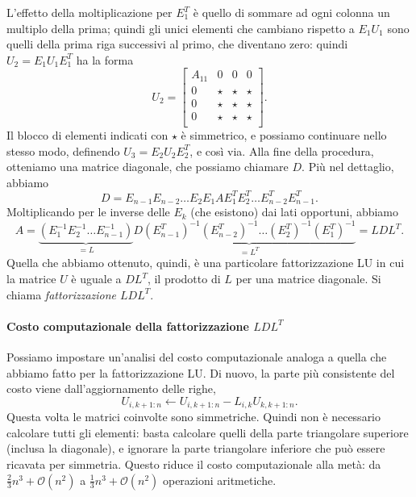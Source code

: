 \documentclass[a4paper]{report}
\theoremstyle{definiton}
\theoremstyle{remark}
\begin{document}
L'effetto della moltiplicazione per $E_1^T$ è quello di sommare ad ogni colonna un multiplo della prima; quindi gli unici elementi che cambiano rispetto a $E_1 U_1$ sono quelli della prima riga successivi al primo, che diventano zero: quindi $U_2 = E_1 U_1 E_1^T$ ha la forma
\[
U_2 = \begin{bmatrix}
    A_{11} & 0 & 0 & 0\\
    0 & \star & \star & \star\\
    0 & \star & \star & \star\\
    0 & \star & \star & \star\\
\end{bmatrix}.  
\]
Il blocco di elementi indicati con $\star$ è simmetrico, e possiamo continuare nello stesso modo, definendo $U_3 = E_2 U_2 E_2^T$, e così via. Alla fine della procedura, otteniamo una matrice diagonale, che possiamo chiamare $D$. Più nel dettaglio, abbiamo
\[
D = E_{n-1}E_{n-2}\dots E_2 E_1 A E_1^T E_2^T\dots E_{n-2}^T E_{n-1}^T.
\]
Moltiplicando per le inverse delle $E_k$ (che esistono) dai lati opportuni, abbiamo
\[
A = \underbrace{(E_1^{-1}E_2^{-1}\dots E_{n-1}^{-1}) }_{=L}D \underbrace{(E_{n-1}^T)^{-1}  (E_{n-2}^T)^{-1} \dots (E_{2}^T)^{-1} (E_{1}^T)^{-1}}_{=L^T} = LDL^T.
\]
Quella che abbiamo ottenuto, quindi, è una particolare fattorizzazione LU in cui la matrice $U$ è uguale a $DL^T$, il prodotto di $L$ per una matrice diagonale. Si chiama \emph{fattorizzazione $LDL^T$}.

\paragraph{Costo computazionale della fattorizzazione $LDL^T$}

Possiamo impostare un'analisi del costo computazionale analoga a quella che abbiamo fatto per la fattorizzazione LU. Di nuovo, la parte più consistente del costo viene dall'aggiornamento delle righe, 
\[
U_{i,k+1:n} \gets U_{i,k+1:n} - L_{i,k}U_{k,k+1:n}.
\]
Questa volta le matrici coinvolte sono simmetriche. Quindi non è necessario calcolare tutti gli elementi: basta calcolare quelli della parte triangolare superiore (inclusa la diagonale), e ignorare la parte triangolare inferiore che può essere ricavata per simmetria. Questo riduce il costo computazionale alla metà: da $\frac23 n^3 + \mathcal{O}(n^2)$ a $\frac13n^3 + \mathcal{O}(n^2)$ operazioni aritmetiche.
\end{document}
